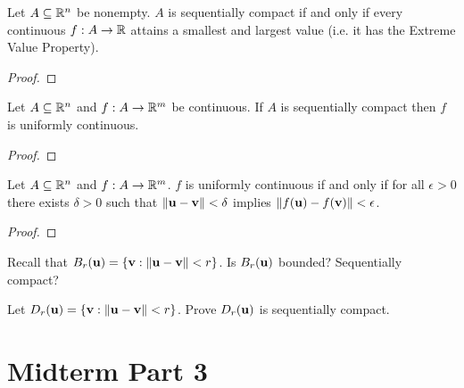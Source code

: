 \documentclass[letterpaper, twoside, 12pt]{book}
\begin{document}
\begin{theorem}[11.24]
  Let \(A\subseteq\mathbb R^n\) be nonempty.
  \(A\) is sequentially compact if and only if
  every continuous \(f:A\to\mathbb R\) attains a smallest and largest value
  (i.e. it has the Extreme Value Property).
\end{theorem}
\begin{proof}

\end{proof}

\begin{theorem}[11.25, Exercise 5]
  Let \(A\subseteq\mathbb R^n\) and \(f:A\to\mathbb R^m\) be continuous.
  If \(A\) is sequentially compact then \(f\) is uniformly continuous.
\end{theorem}
\begin{proof}

\end{proof}

\begin{theorem}[11.27, Exercise 11]
  Let \(A\subseteq\mathbb R^n\) and \(f:A\to\mathbb R^m\).
  \(f\) is uniformly continuous if and only if for all \(\epsilon>0\)
  there exists \(\delta>0\) such that \(\|\mathbf u-\mathbf v\|<\delta\)
  implies \(\|f(\mathbf u)-f(\mathbf v)\|<\epsilon\).
\end{theorem}
\begin{proof}

\end{proof}

\begin{exercise}[2,3]
  Recall that \(B_r(\mathbf u)=\{\mathbf v:\|\mathbf u-\mathbf v\|<r\}\).
  Is \(B_r(\mathbf u)\) bounded? Sequentially compact?
\end{exercise}
\begin{solution}

\end{solution}

\begin{exercise}[4]
  Let \(D_r(\mathbf u)=\{\mathbf v:\|\mathbf u-\mathbf v\|<r\}\).
  Prove \(D_r(\mathbf u)\) is sequentially compact.
\end{exercise}
\begin{solution}

\end{solution}








\chapter*{Midterm Part 3}
\end{document}
